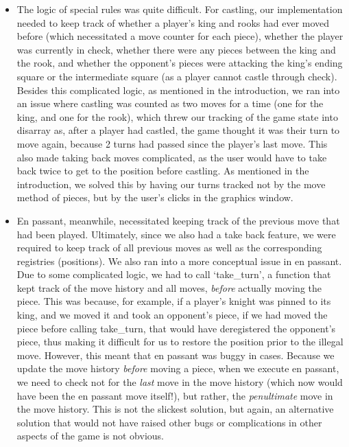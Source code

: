 \documentclass{article}
\begin{document}
\begin{itemize}
    \item The logic of special rules was quite difficult. For castling, our implementation needed to keep track of whether a player's king and rooks had ever moved before (which necessitated a move counter for each piece), whether the player was currently in check, whether there were any pieces between the king and the rook, and whether the opponent's pieces were attacking the king's ending square or the intermediate square (as a player cannot castle through check). Besides this complicated logic, as mentioned in the introduction, we ran into an issue where castling was counted as two moves for a time (one for the king, and one for the rook), which threw our tracking of the game state into disarray as, after a player had castled, the game thought it was their turn to move again, because 2 turns had passed since the player's last move. This also made taking back moves complicated, as the user would have to take back twice to get to the position before castling. As mentioned in the introduction, we solved this by having our turns tracked not by the move method of pieces, but by the user's clicks in the graphics window.
    
    \item En passant, meanwhile, necessitated keeping track of the previous move that had been played. Ultimately, since we also had a take back feature, we were required to keep track of all previous moves as well as the corresponding registries (positions). We also ran into a more conceptual issue in en passant. Due to some complicated logic, we had to call `take\_turn', a function that kept track of the move history and all moves, \textit{before} actually moving the piece. This was because, for example, if a player's knight was pinned to its king, and we moved it and took an opponent's piece, if we had moved the piece before calling take\_turn, that would have deregistered the opponent's piece, thus making it difficult for us to restore the position prior to the illegal move. However, this meant that en passant was buggy in cases. Because we update the move history \textit{before} moving a piece, when we execute en passant, we need to check not for the \textit{last} move in the move history (which now would have been the en passant move itself!), but rather, the \textit{penultimate} move in the move history. This is not the slickest solution, but again, an alternative solution that would not have raised other bugs or complications in other aspects of the game is not obvious.


\end{itemize}
\end{document}
